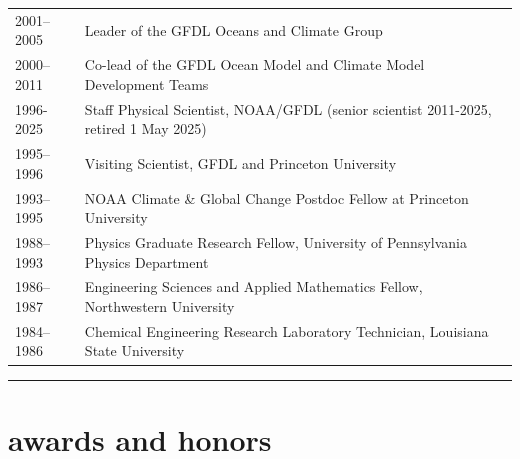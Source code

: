 \documentclass{article}
\begin{document}
\begin{tabular}{ll}
  2001--2005     & Leader of the GFDL Oceans and Climate Group \\
 
  2000--2011     & Co-lead of the GFDL Ocean Model and Climate Model Development Teams \\
  
  1996-2025   &  Staff Physical Scientist, NOAA/GFDL (senior scientist 2011-2025, retired 1 May 2025)  \\  
  
  1995--1996     &  Visiting Scientist, GFDL and Princeton University  \\ 
  
  1993--1995     & NOAA Climate \& Global Change Postdoc Fellow at Princeton University \\
  
  1988--1993     &  Physics Graduate Research Fellow, University of Pennsylvania Physics Department  \\                     
  
  1986--1987     &  Engineering Sciences and Applied Mathematics Fellow, Northwestern University \\
  
  1984--1986     &  Chemical Engineering Research Laboratory Technician, Louisiana State University

\end{tabular}


\noindent\rule{\textwidth}{1pt}
\vspace{-.5cm}
\section*{\sc  \color{Maroon}   awards and honors}
\vspace{-.25cm}
\end{document}
